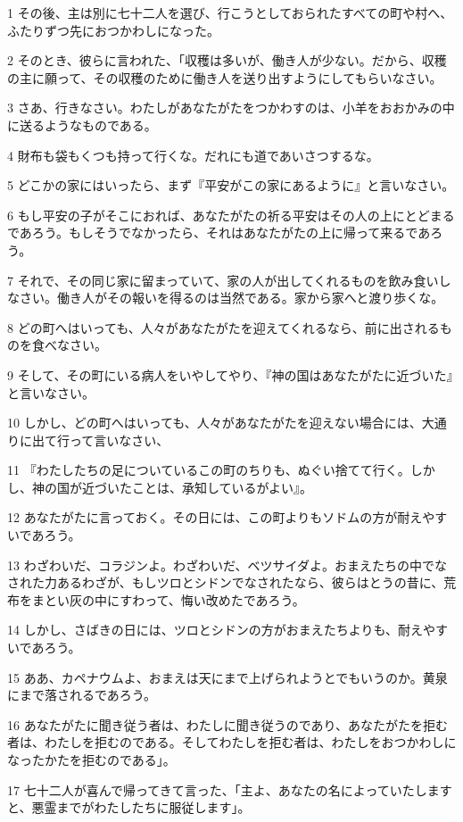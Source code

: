 \par 1 その後、主は別に七十二人を選び、行こうとしておられたすべての町や村へ、ふたりずつ先におつかわしになった。
\par 2 そのとき、彼らに言われた、「収穫は多いが、働き人が少ない。だから、収穫の主に願って、その収穫のために働き人を送り出すようにしてもらいなさい。
\par 3 さあ、行きなさい。わたしがあなたがたをつかわすのは、小羊をおおかみの中に送るようなものである。
\par 4 財布も袋もくつも持って行くな。だれにも道であいさつするな。
\par 5 どこかの家にはいったら、まず『平安がこの家にあるように』と言いなさい。
\par 6 もし平安の子がそこにおれば、あなたがたの祈る平安はその人の上にとどまるであろう。もしそうでなかったら、それはあなたがたの上に帰って来るであろう。
\par 7 それで、その同じ家に留まっていて、家の人が出してくれるものを飲み食いしなさい。働き人がその報いを得るのは当然である。家から家へと渡り歩くな。
\par 8 どの町へはいっても、人々があなたがたを迎えてくれるなら、前に出されるものを食べなさい。
\par 9 そして、その町にいる病人をいやしてやり、『神の国はあなたがたに近づいた』と言いなさい。
\par 10 しかし、どの町へはいっても、人々があなたがたを迎えない場合には、大通りに出て行って言いなさい、
\par 11 『わたしたちの足についているこの町のちりも、ぬぐい捨てて行く。しかし、神の国が近づいたことは、承知しているがよい』。
\par 12 あなたがたに言っておく。その日には、この町よりもソドムの方が耐えやすいであろう。
\par 13 わざわいだ、コラジンよ。わざわいだ、ベツサイダよ。おまえたちの中でなされた力あるわざが、もしツロとシドンでなされたなら、彼らはとうの昔に、荒布をまとい灰の中にすわって、悔い改めたであろう。
\par 14 しかし、さばきの日には、ツロとシドンの方がおまえたちよりも、耐えやすいであろう。
\par 15 ああ、カペナウムよ、おまえは天にまで上げられようとでもいうのか。黄泉にまで落されるであろう。
\par 16 あなたがたに聞き従う者は、わたしに聞き従うのであり、あなたがたを拒む者は、わたしを拒むのである。そしてわたしを拒む者は、わたしをおつかわしになったかたを拒むのである」。
\par 17 七十二人が喜んで帰ってきて言った、「主よ、あなたの名によっていたしますと、悪霊までがわたしたちに服従します」。

